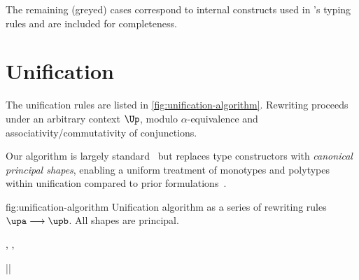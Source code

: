 \documentclass[acmsmall,screen,nonacm,review]{acmart}
\begin{document}
The remaining (greyed) cases  correspond to internal
constructs used in \OML's typing rules and are included for completeness.


\section{Unification}
\label{app:unification}

The unification rules are listed in \cref{fig:unification-algorithm}.
Rewriting proceeds under an arbitrary context $\Up$, modulo $\alpha$-equivalence
and associativity/commutativity of conjunctions.

Our algorithm is largely standard~\citep*{Pottier-Remy/emlti} but replaces type
constructors with \emph{canonical principal shapes}, enabling a uniform
treatment of monotypes and polytypes within unification compared to
prior formulations~\citep*{Garrigue-Remy/poly-ml}.

%


\begin{mathparfig}[htpb!]
  {fig:unification-algorithm}
  {Unification algorithm as a series of rewriting rules
   $\upa \unif \upb$. All shapes are principal.}
   \rewrite[U-Exists]
      {(\cexists \alpha \upa) \cand \upb }{ \tv \disjoint \upb}
      {\cexists \tv {\upa \cand \upb}}

    \rewrite[U-Cycle]
      {\up }{ \cyclic \up}
      {\cfalse}

    \rewrite[U-True]
      {\up \cand \ctrue}
      {}
      {\up}

    \rewrite[U-False]
      {\Up\where\cfalse }{ \Up \neq \square}
      {\cfalse}

    \rewrite[U-Merge]
      {\cunif \tv \ueqa \cand \cunif \tv \ueqb}
      {}
      {\cunif \tv {\cunif \ueqa \ueqb}}

    \rewrite[U-Stutter]
      {\cunif \tv {\cunif \tv \ueq}}
      {}
      {\cunif \tv \ueq}

    \rewrite[U-Name]
      {\cunif {\pshapp \parens{\tys, \ti, \typs}} \ueq }
      { \tv \disjoint \tys, \typs, \ueq \\ \ti \notin \TyVars}
      {\cexists \tv {\cunif \tv \ti \cand \cunif {\pshapp \parens{\tys, \tv, \typs}} \ueq}}

    \rewrite[U-Decomp]
      {\cunif {\pshapp \tvs} {\cunif {\pshapp \tvbs} \ueq}}
      {}
      {\cunif {\pshapp \tvs} \ueq \cand \cunif \tvs \tvbs}

    \rewrite[U-Clash]
      {\cunif {\pshapp \tvs} {\cunif {\pshapp[\shp]\tvbs } \ueq }}{
       \sh \neq \shp}
      {\cfalse}

    \rewrite[U-Trivial]
      {\ueq }
      {|\ueq| }
      {\ctrue}
\end{mathparfig}
\end{document}
